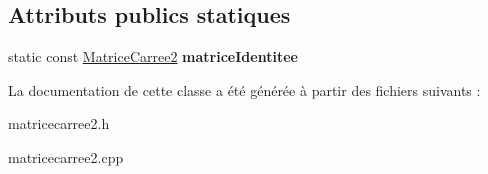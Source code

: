 \subsection*{Attributs publics statiques}
\begin{DoxyCompactItemize}
\item 
\hypertarget{class_matrice_carree2_aa733d1b47f9284bb4cafe32ca6a3cc2a}{static const \hyperlink{class_matrice_carree2}{Matrice\+Carree2} {\bfseries matrice\+Identitee}}\label{class_matrice_carree2_aa733d1b47f9284bb4cafe32ca6a3cc2a}

\end{DoxyCompactItemize}


La documentation de cette classe a été générée à partir des fichiers suivants \+:\begin{DoxyCompactItemize}
\item 
matricecarree2.\+h\item 
matricecarree2.\+cpp\end{DoxyCompactItemize}

